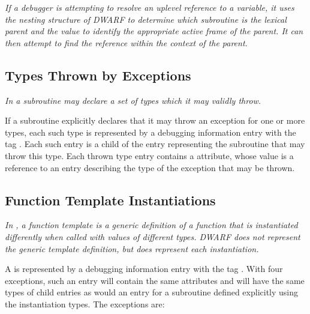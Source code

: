 \textit{If a debugger is attempting to resolve an up\dash level reference
to a variable, it uses the nesting structure of DWARF to
determine which subroutine is the lexical parent and the
 value to identify the appropriate active
frame of the parent. It can then attempt to find the reference
within the context of the parent.}



\subsection{Types Thrown by Exceptions}
\label{chap:typesthrownbyexceptions}

\textit{In  a subroutine may declare a set of types which
it may validly throw.}

If a subroutine explicitly declares that it may throw
an 
exception for one or more types, each such type is
represented by a debugging information entry with 
the tag
.  
Each such entry is a child of the entry
representing the subroutine that may throw this type. Each
thrown type entry contains 
a  attribute, whose
value is a reference to an entry describing the type of the
exception that may be thrown.

\subsection{Function Template Instantiations}
\label{chap:functiontemplateinstantiations}

\textit{In , a function template is a generic definition of
a function that is instantiated differently when called with
values of different types. DWARF does not represent the generic
template definition, but does represent each instantiation.}

A  is represented by a debugging
information entry with the 
tag . 
With four
exceptions, such an entry will contain the same attributes and
will have the same types of child entries as would an entry
for a subroutine defined explicitly using the instantiation
types. The exceptions are:

